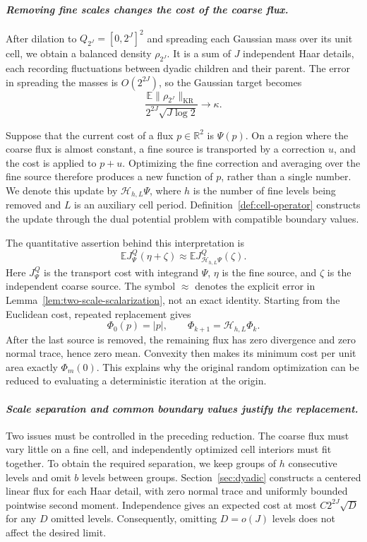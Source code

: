 \documentclass{aomart}
\theoremstyle{definition}
\newcommand{\1}{\mathbf 1}
\newcommand{\KR}{\mathrm{KR}}
\begin{document}
\smallskip
\paragraph{\textit{Removing fine scales changes the cost of the coarse flux.}}
After dilation to $Q_{2^J}=[0,2^J]^2$ and spreading each Gaussian mass
over its unit cell, we obtain a balanced density $\rho_{2^J}$.
It is a sum of $J$ independent Haar details, each recording fluctuations
between dyadic children and their parent.  The error in spreading the
masses is $O(2^{2J})$, so the Gaussian target becomes
\[
\frac{\mathbb E\|\rho_{2^J}\|_{\KR}}{2^{2J}\sqrt{J\log2}}
\longrightarrow\kappa.
\]

Suppose that the current cost of a flux $p\in\mathbb R^2$ is $\Psi(p)$.
On a region where the coarse flux is almost constant, a fine source is
transported by a correction $u$, and the cost is applied to $p+u$.
Optimizing the fine correction and averaging over the fine source
therefore produces a new function of $p$, rather than a single number.
We denote this update by $\mathcal H_{h,L}\Psi$, where $h$ is the number
of fine levels being removed and $L$ is an auxiliary cell period.
Definition~\ref{def:cell-operator} constructs the update through the dual
potential problem with compatible boundary values.

The quantitative assertion behind this interpretation is
\[
\mathbb E J_\Psi^Q(\eta+\zeta)
\approx\mathbb E J_{\mathcal H_{h,L}\Psi}^Q(\zeta).
\]
Here $J_\Psi^Q$ is the transport cost with integrand $\Psi$, $\eta$ is the
fine source, and $\zeta$ is the independent coarse source.  The symbol
$\approx$ denotes the explicit error in
Lemma~\ref{lem:two-scale-scalarization}, not an exact identity.
Starting from the Euclidean cost, repeated replacement gives
\[
\Phi_0(p)=|p|,\qquad \Phi_{k+1}=\mathcal H_{h,L}\Phi_k.
\]
After the last source is removed, the remaining flux has zero divergence
and zero normal trace, hence zero mean.  Convexity then makes its minimum
cost per unit area exactly $\Phi_m(0)$.  This explains why the original
random optimization can be reduced to evaluating a deterministic
iteration at the origin.

\smallskip
\paragraph{\textit{Scale separation and common boundary values justify the replacement.}}
Two issues must be controlled in the preceding reduction.  The coarse
flux must vary little on a fine cell, and independently optimized cell
interiors must fit together.  To obtain the required separation, we keep
groups of $h$ consecutive levels and omit $b$ levels between groups.
Section~\ref{sec:dyadic} constructs a centered linear flux for each Haar
detail, with zero normal trace and uniformly bounded pointwise second
moment.  Independence gives an expected cost at most
$C2^{2J}\sqrt D$ for any $D$ omitted levels.  Consequently, omitting
$D=o(J)$ levels does not affect the desired limit.
\end{document}
